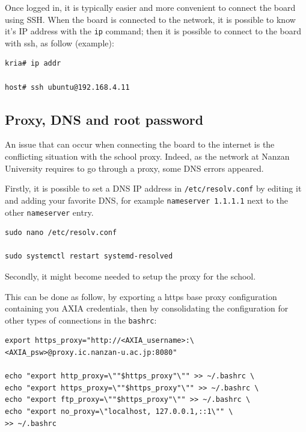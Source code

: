 \documentclass[10pt]{article}
\begin{document}
Once logged in, it is typically easier and more convenient to connect the board using SSH.
When the board is connected to the network, it is possible to know it's IP address with
the \verb|ip| command; then it is possible to connect to the board with ssh, as follow (example):
\begin{tcolorbox}
\begin{verbatim}
kria# ip addr

host# ssh ubuntu@192.168.4.11
\end{verbatim}
\end{tcolorbox}

\subsection{Proxy, DNS and root password}
\label{sec:proxy-dns}
An issue that can occur when connecting the board to the internet is the conflicting situation with
the school proxy.
Indeed, as the network at Nanzan University requires to go through a proxy, some DNS errors appeared.

Firstly, it is possible to set a DNS IP address in \verb|/etc/resolv.conf| by editing it and adding your favorite DNS, for example \verb|nameserver 1.1.1.1|
next to the other \verb|nameserver| entry.
\begin{tcolorbox}
\begin{verbatim}
sudo nano /etc/resolv.conf

sudo systemctl restart systemd-resolved
\end{verbatim}
\end{tcolorbox}

Secondly, it might become needed to setup the proxy for the school.

This can be done as follow, by exporting a https base proxy configuration containing you AXIA credentials, then
by consolidating the configuration for other types of connections in the \verb|bashrc|:
\begin{tcolorbox}
\begin{verbatim}
export https_proxy="http://<AXIA_username>:\
<AXIA_psw>@proxy.ic.nanzan-u.ac.jp:8080"

echo "export http_proxy=\""$https_proxy"\"" >> ~/.bashrc \
echo "export https_proxy=\""$https_proxy"\"" >> ~/.bashrc \
echo "export ftp_proxy=\""$https_proxy"\"" >> ~/.bashrc \
echo "export no_proxy=\"localhost, 127.0.0.1,::1\"" \
>> ~/.bashrc
\end{verbatim}
\end{tcolorbox}
\end{document}
